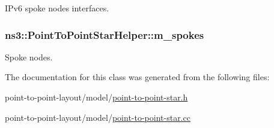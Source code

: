 I\+Pv6 spoke nodes interfaces. 

\subsubsection[{\texorpdfstring{m\+\_\+spokes}{m_spokes}}]{ ns3\+::\+Point\+To\+Point\+Star\+Helper\+::m\+\_\+spokes\hspace{0.3cm}{\ttfamily [private]}}\hypertarget{classns3_1_1PointToPointStarHelper_a4f501e83d42c3b830f41c85621893737}{}\label{classns3_1_1PointToPointStarHelper_a4f501e83d42c3b830f41c85621893737}


Spoke nodes. 



The documentation for this class was generated from the following files\+:\begin{DoxyCompactItemize}
\item 
point-\/to-\/point-\/layout/model/\hyperlink{point-to-point-star_8h}{point-\/to-\/point-\/star.\+h}\item 
point-\/to-\/point-\/layout/model/\hyperlink{point-to-point-star_8cc}{point-\/to-\/point-\/star.\+cc}\end{DoxyCompactItemize}
